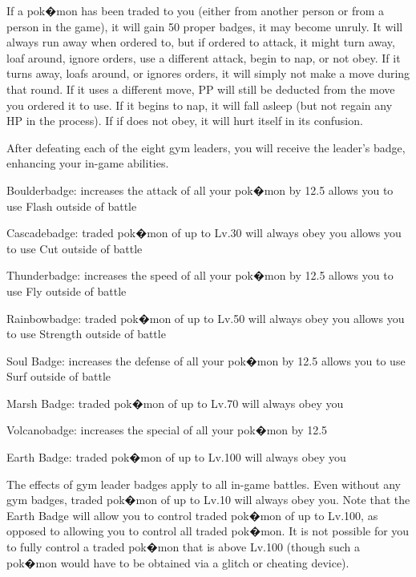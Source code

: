 \documentclass[reprint, aps, prl, paper=A4]{revtex4-1}
\begin{document}
If a pok�mon has been traded to you (either from another person or from a person in the game),
it will gain 50%
proper badges, it may become unruly. It will always run away when ordered to, but if ordered to
attack, it might turn away, loaf around, ignore orders, use a different attack, begin to nap,
or not obey. If it turns away, loafs around, or ignores orders, it will simply not make a move
during that round. If it uses a different move, PP will still be deducted from the move you
ordered it to use. If it begins to nap, it will fall asleep (but not regain any HP in the
process). If if does not obey, it will hurt itself in its confusion.

After defeating each of the eight gym leaders, you will receive the leader's badge, enhancing
your in-game abilities.

Boulderbadge: increases the attack of all your pok�mon by 12.5%
              allows you to use Flash outside of battle

Cascadebadge: traded pok�mon of up to Lv.30 will always obey you
              allows you to use Cut outside of battle

Thunderbadge: increases the speed of all your pok�mon by 12.5%
              allows you to use Fly outside of battle

Rainbowbadge: traded pok�mon of up to Lv.50 will always obey you
              allows you to use Strength outside of battle

Soul Badge: increases the defense of all your pok�mon by 12.5%
            allows you to use Surf outside of battle

Marsh Badge: traded pok�mon of up to Lv.70 will always obey you

Volcanobadge: increases the special of all your pok�mon by 12.5%

Earth Badge: traded pok�mon of up to Lv.100 will always obey you

The effects of gym leader badges apply to all in-game battles. Even without any gym badges,
traded pok�mon of up to Lv.10 will always obey you. Note that the Earth Badge will allow you
to control traded pok�mon of up to Lv.100, as opposed to allowing you to control all traded
pok�mon. It is not possible for you to fully control a traded pok�mon that is above Lv.100
(though such a pok�mon would have to be obtained via a glitch or cheating device).
\end{document}
